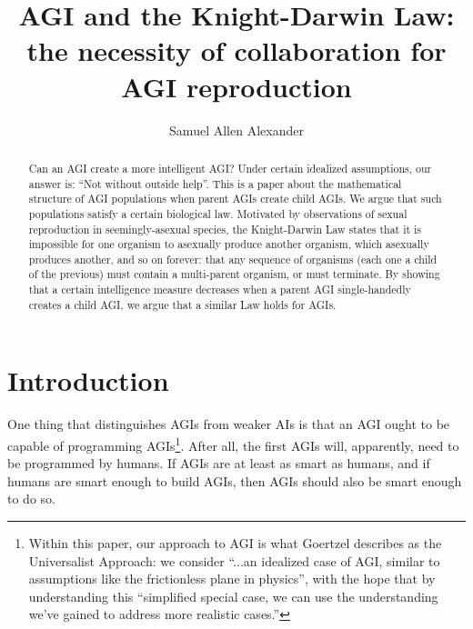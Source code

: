 \documentclass[runningheads]{llncs}
\begin{document}
\title{AGI and the Knight-Darwin Law: the necessity of collaboration for
AGI reproduction}

\author{Samuel Allen Alexander}

\maketitle

\begin{abstract}
Can an AGI create a more intelligent AGI?
Under certain idealized assumptions, our answer is:
``Not without outside help''.
This is a paper about the mathematical structure of AGI populations
when parent AGIs create child AGIs. We argue that such populations
satisfy a certain biological law.
Motivated by observations of sexual reproduction in seemingly-asexual
species,
the Knight-Darwin Law states that it is impossible for one organism
to asexually produce another organism, which asexually produces another,
and so on forever:
that any sequence of organisms (each one a child of the previous) must contain
a multi-parent organism, or must terminate.
By showing that a certain intelligence measure decreases when a parent AGI
single-handedly creates a child AGI,
we argue that a similar Law holds for AGIs.


\end{abstract}

\section{Introduction}

One thing that distinguishes AGIs from weaker AIs is that an
AGI ought to be capable of programming AGIs\footnote{Within this paper,
our approach to AGI is what Goertzel \cite{goertzel2014artificial} describes
as the Universalist Approach:
we consider ``...an idealized case of AGI, similar to
assumptions like the frictionless plane in physics'', with the hope that by
understanding this ``simplified special
case, we can use the understanding we've gained to address more realistic
cases.''}. After all, the first AGIs will,
apparently, need to be programmed by humans. If AGIs are at least as smart as
humans, and if humans are smart enough to
build AGIs, then AGIs should also be smart enough to do so.
\end{document}
